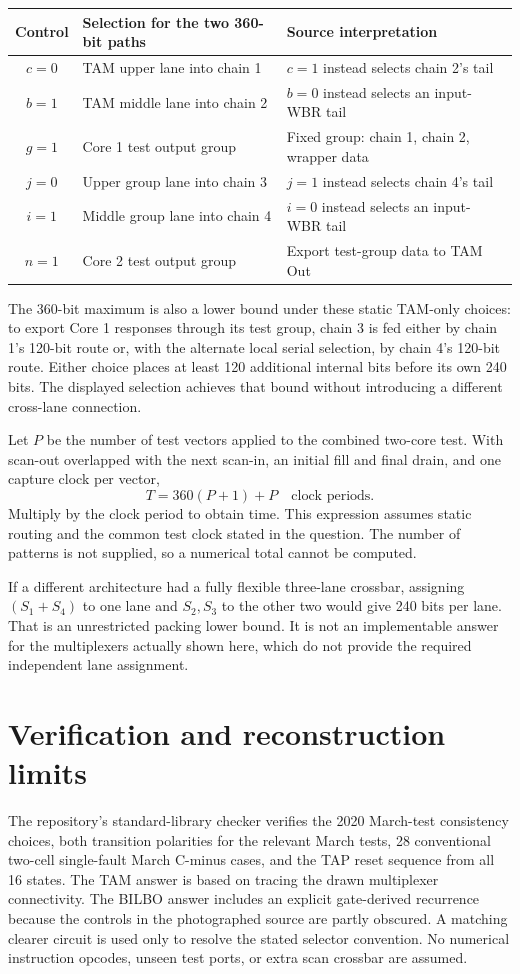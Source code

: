 \begin{center}\small
\begin{tabular}{cll}
\toprule Control & Selection for the two 360-bit paths & Source interpretation\\\midrule
$c=0$&TAM upper lane into chain 1&$c=1$ instead selects chain 2's tail\\
$b=1$&TAM middle lane into chain 2&$b=0$ instead selects an input-WBR tail\\
$g=1$&Core 1 test output group&Fixed group: chain 1, chain 2, wrapper data\\
$j=0$&Upper group lane into chain 3&$j=1$ instead selects chain 4's tail\\
$i=1$&Middle group lane into chain 4&$i=0$ instead selects an input-WBR tail\\
$n=1$&Core 2 test output group&Export test-group data to TAM Out\\
\bottomrule
\end{tabular}
\end{center}
The 360-bit maximum is also a lower bound under these static TAM-only choices: to export Core 1 responses through its test group, chain 3 is fed either by chain 1's 120-bit route or, with the alternate local serial selection, by chain 4's 120-bit route. Either choice places at least 120 additional internal bits before its own 240 bits. The displayed selection achieves that bound without introducing a different cross-lane connection.

Let $P$ be the number of test vectors applied to the combined two-core test. With scan-out overlapped with the next scan-in, an initial fill and final drain, and one capture clock per vector,
\[
\boxed{T=360(P+1)+P\quad\text{clock periods}.}
\]
Multiply by the clock period to obtain time. This expression assumes static routing and the common test clock stated in the question. The number of patterns is not supplied, so a numerical total cannot be computed.

If a different architecture had a fully flexible three-lane crossbar, assigning $(S_1+S_4)$ to one lane and $S_2,S_3$ to the other two would give 240 bits per lane. That is an unrestricted packing lower bound. It is not an implementable answer for the multiplexers actually shown here, which do not provide the required independent lane assignment.

\section*{Verification and reconstruction limits}
The repository's standard-library checker verifies the 2020 March-test consistency choices, both transition polarities for the relevant March tests, 28 conventional two-cell single-fault March C-minus cases, and the TAP reset sequence from all 16 states. The TAM answer is based on tracing the drawn multiplexer connectivity. The BILBO answer includes an explicit gate-derived recurrence because the controls in the photographed source are partly obscured. A matching clearer circuit is used only to resolve the stated selector convention. No numerical instruction opcodes, unseen test ports, or extra scan crossbar are assumed.
